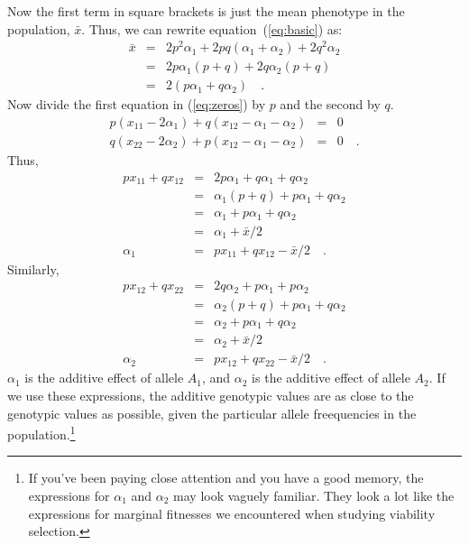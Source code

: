 Now the first term in square brackets is just the mean phenotype in
the population, $\bar x$.  Thus, we can rewrite
equation~(\ref{eq:basic}) as:
\begin{eqnarray}
{\bar x} &=& 2p^2\alpha_1 + 2pq(\alpha_1 + \alpha_2)
                        +2q^2\alpha_2 \nonumber \\
                     &=& 2p\alpha_1(p+q) + 2q\alpha_2(p+q) \nonumber \\
                     &=& 2(p\alpha_1 + q\alpha_2) \quad . \label{eq:alpha_bar}
\end{eqnarray}
Now divide the first equation in (\ref{eq:zeros}) by $p$ and the
second by $q$.
\begin{eqnarray}
p(x_{11} - 2\alpha_1) + q(x_{12} - \alpha_1 - \alpha_2) &=& 0
\label{eq:zeros_divide_1} \\
q(x_{22} - 2\alpha_2) + p(x_{12} - \alpha_1 - \alpha_2) &=& 0 \quad
. \label{eq:zeros_divide_2}
\end{eqnarray}
Thus,
\begin{eqnarray*}
px_{11} + qx_{12} &=& 2p\alpha_1 + q\alpha_1 + q\alpha_2 \\
 &=& \alpha_1(p + q) + p\alpha_1 + q\alpha_2 \\
 &=& \alpha_1 + p\alpha_1 + q\alpha_2 \\
 &=& \alpha_1 + {\bar x}/2 \\
\alpha_1 &=& px_{11} + qx_{12} - {\bar x}/2 \quad .
\end{eqnarray*}
Similarly,
\begin{eqnarray*}
px_{12} + qx_{22} &=& 2q\alpha_2 + p\alpha_1 + p\alpha_2 \\
 &=& \alpha_2(p + q) + p\alpha_1 + q\alpha_2 \\
 &=& \alpha_2 + p\alpha_1 + q\alpha_2 \\
 &=& \alpha_2 + {\bar x}/2 \\
\alpha_2 &=& px_{12} + qx_{22} - {\bar x}/2 \quad .
\end{eqnarray*}
$\alpha_1$ is the additive effect of allele $A_1$, and $\alpha_2$ is
the additive effect of allele $A_2$. If we use these expressions, the
additive genotypic values are as close to the genotypic values as
possible, given the particular allele freequencies in the
population.\footnote{If you've been paying close attention and you
  have a good memory, the expressions for $\alpha_1$ and $\alpha_2$
  may look vaguely familiar. They look a lot like the expressions for
  marginal fitnesses we encountered when studying viability
  selection.}

